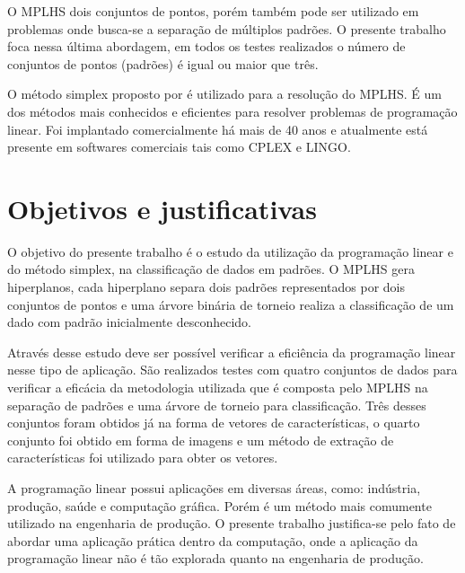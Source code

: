 
O MPLHS dois conjuntos de pontos, porém também pode ser utilizado em problemas onde busca-se a separação de múltiplos padrões. O presente trabalho foca nessa última abordagem, em todos os testes realizados o número de conjuntos de pontos (padrões) é igual ou maior que três.

O método simplex proposto por  é utilizado para a resolução do MPLHS. É um dos métodos mais conhecidos e eficientes para resolver problemas de programação linear. Foi implantado comercialmente há mais de 40 anos e atualmente está presente em softwares comerciais tais como CPLEX e LINGO. 


\section{Objetivos e justificativas}
O objetivo do presente trabalho é o estudo da utilização da programação linear e do método simplex, na classificação de dados em padrões. O MPLHS gera hiperplanos, cada hiperplano separa dois padrões representados por dois conjuntos de pontos e uma árvore binária de torneio realiza a classificação de um dado com padrão inicialmente desconhecido.

Através desse estudo deve ser possível verificar a eficiência da programação linear nesse tipo de aplicação. São realizados testes com quatro conjuntos de dados para verificar a eficácia da metodologia utilizada que é composta pelo MPLHS na separação de padrões e uma árvore de torneio para classificação. Três desses conjuntos foram obtidos já na forma de vetores de características, o quarto conjunto foi obtido em forma de imagens e um método de extração de características foi utilizado para obter os vetores.

A programação linear possui aplicações em diversas áreas, como: indústria, produção, saúde e computação gráfica. Porém é um método mais comumente utilizado na engenharia de produção. O presente trabalho justifica-se pelo fato de abordar uma aplicação prática dentro da computação, onde a aplicação da programação linear não é tão explorada quanto na engenharia de produção.

